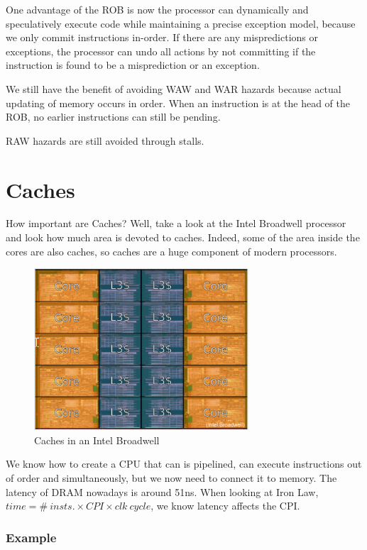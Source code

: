 \documentclass{article}
\begin{document}
One advantage of the ROB is now the processor can dynamically and speculatively execute code while maintaining a precise exception model, because we only commit instructions in-order. If there are any mispredictions or exceptions, the processor can undo all actions by not committing if the instruction is found to be a misprediction or an exception. 

We still have the benefit of avoiding WAW and WAR hazards because actual updating of memory occurs in order. When an instruction is at the head of the ROB, no earlier instructions can still be pending. 

RAW hazards are still avoided through stalls. 

\newpage
\section{Caches}

How important are Caches? Well, take a look at the Intel Broadwell processor and look how much area is devoted to caches. Indeed, some of the area inside the cores are also caches, so caches are a huge component of modern processors.

\begin{figure}[ht!]
\centering
\includegraphics[width=80mm]{img/Cache.png}
\caption{Caches in an Intel Broadwell}
\end{figure}

We know how to create a CPU that can is pipelined, can execute instructions out of order and simultaneously, but we now need to connect it to memory. The latency of DRAM nowadays is around 51ns. When looking at Iron Law, $time = \#\ insts. \times CPI \times clk\ cycle$, we know latency affects the CPI. 

\subsubsection*{Example}
\end{document}
